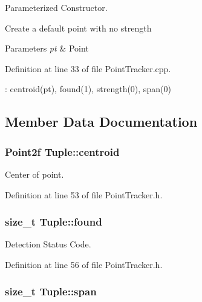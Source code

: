 \-Parameterized \-Constructor. 

\-Create a default point with no strength 
\begin{DoxyParams}{\-Parameters}
{\em pt} & \-Point \\
\hline
\end{DoxyParams}


\-Definition at line 33 of file \-Point\-Tracker.\-cpp.


\begin{DoxyCode}
                              : centroid(pt), found(1), strength(0), span(0) {

}
\end{DoxyCode}


\subsection{\-Member \-Data \-Documentation}
\hypertarget{class_tuple_ab3df7dd8c3da6e5d69e20492adcfb1ee}{
\subsubsection[{centroid}]{\setlength{\rightskip}{0pt plus 5cm}\-Point2f {\bf \-Tuple\-::centroid}}}
\label{class_tuple_ab3df7dd8c3da6e5d69e20492adcfb1ee}


\-Center of point. 



\-Definition at line 53 of file \-Point\-Tracker.\-h.

\hypertarget{class_tuple_a29532869144a5cfc2b2eb935d91edcd9}{
\subsubsection[{found}]{\setlength{\rightskip}{0pt plus 5cm}size\-\_\-t {\bf \-Tuple\-::found}}}
\label{class_tuple_a29532869144a5cfc2b2eb935d91edcd9}


\-Detection \-Status \-Code. 



\-Definition at line 56 of file \-Point\-Tracker.\-h.

\hypertarget{class_tuple_ae321f88dc0b67f9e0f89e51b25db02c5}{
\subsubsection[{span}]{\setlength{\rightskip}{0pt plus 5cm}size\-\_\-t {\bf \-Tuple\-::span}}}
\label{class_tuple_ae321f88dc0b67f9e0f89e51b25db02c5}


